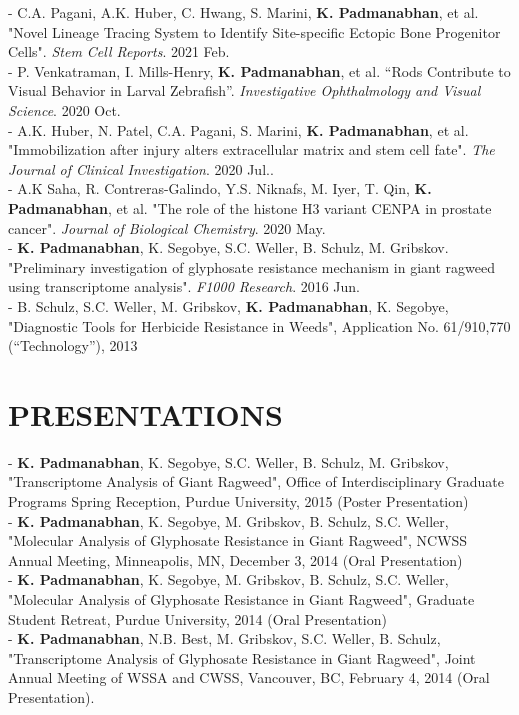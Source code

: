 \documentclass[11pt,letterpaper,sans]{moderncv}        %
\begin{document}
{{\begin{minipage}{\maincolumnwidth}
{	- C.A. Pagani, A.K. Huber, C. Hwang, S. Marini, \textbf{K. Padmanabhan}, et al. "Novel Lineage Tracing System to Identify Site-specific Ectopic Bone Progenitor Cells". \textit{Stem Cell Reports}. 2021 Feb.\\
          - P. Venkatraman, I. Mills-Henry, \textbf{K. Padmanabhan}, et al. “Rods Contribute to Visual Behavior in Larval Zebrafish”. \textit{Investigative Ophthalmology and Visual Science}. 2020 Oct.\\
	- A.K. Huber, N. Patel, C.A. Pagani, S. Marini, \textbf{K. Padmanabhan}, et al. "Immobilization after injury alters extracellular matrix and stem cell fate". \textit{The Journal of Clinical Investigation}. 2020 Jul..\\
          - A.K Saha, R. Contreras-Galindo, Y.S. Niknafs, M. Iyer, T. Qin, \textbf{K. Padmanabhan}, et al. "The role of the histone H3 variant CENPA in prostate cancer". \textit{Journal of Biological Chemistry}. 2020 May.\\
	- \textbf{K. Padmanabhan}, K. Segobye, S.C. Weller, B. Schulz, M. Gribskov. "Preliminary investigation of glyphosate resistance mechanism in giant ragweed using transcriptome analysis". \textit{F1000 Research}. 2016 Jun.\\
	- B. Schulz, S.C. Weller, M. Gribskov, \textbf{K. Padmanabhan}, K. Segobye, "Diagnostic Tools for Herbicide Resistance in Weeds", Application No. 61/910,770 (“Technology”), 2013
	}%
\end{minipage}%


\section{PRESENTATIONS}
\begin{minipage}{\maincolumnwidth}%
	\small{
	- \textbf{K. Padmanabhan}, K. Segobye, S.C. Weller, B. Schulz, M. Gribskov, "Transcriptome Analysis of Giant Ragweed", Office of Interdisciplinary Graduate Programs Spring Reception, Purdue University, 2015 (Poster Presentation)\\
	- \textbf{K. Padmanabhan}, K. Segobye, M. Gribskov, B. Schulz, S.C. Weller, "Molecular Analysis of Glyphosate Resistance in Giant Ragweed", NCWSS Annual Meeting, Minneapolis, MN, December 3, 2014 (Oral Presentation)\\
	- \textbf{K. Padmanabhan}, K. Segobye, M. Gribskov, B. Schulz, S.C. Weller, "Molecular Analysis of Glyphosate Resistance in Giant Ragweed", Graduate Student Retreat, Purdue University, 2014 (Oral Presentation)\\
          - \textbf{K. Padmanabhan}, N.B. Best, M. Gribskov, S.C. Weller, B. Schulz, "Transcriptome Analysis of Glyphosate Resistance in Giant Ragweed", Joint Annual Meeting of WSSA and CWSS, Vancouver, BC, February 4, 2014 (Oral Presentation).  
	}%
\end{minipage}%

}}
\end{document}
